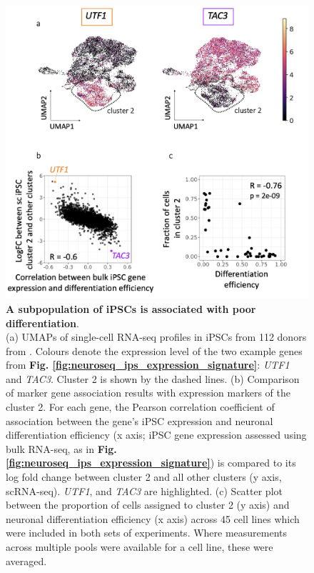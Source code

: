 \begin{figure}[htbp]
\centering
\includegraphics[width=14cm]{Chapter5/Fig/neuroseq_ips_sc_genes.png}
\caption[An iPSC subpopulation is linked to poor differentiation]{\textbf{A subpopulation of iPSCs is associated with poor differentiation}.\\
(a) UMAPs of single-cell RNA-seq profiles in iPSCs from 112 donors from \cite{cuomo2020single}.
Colours denote the expression level of the two example genes from \textbf{Fig. \ref{fig:neuroseq_ips_expression_signature}}: \textit{UTF1} and \textit{TAC3}. 
Cluster 2 is shown by the dashed lines. 
(b) Comparison of marker gene association results with expression markers of the cluster 2. 
For each gene, the Pearson correlation coefficient of association between the gene's iPSC expression and neuronal differentiation efficiency (x axis; iPSC gene expression assessed using bulk RNA-seq, as in \textbf{Fig. \ref{fig:neuroseq_ips_expression_signature}}) is compared to its log fold change between cluster 2 and all other clusters (y axis, scRNA-seq).
\textit{UTF1}, and \textit{TAC3} are highlighted. 
(c) Scatter plot between the proportion of cells assigned to cluster 2 (y axis) and neuronal differentiation efficiency (x axis) across 45 cell lines which were included in both sets of experiments. 
Where measurements across multiple pools were available for a cell line, these were averaged.}
\label{fig:neuroseq_ips_sc_genes}
\end{figure}

